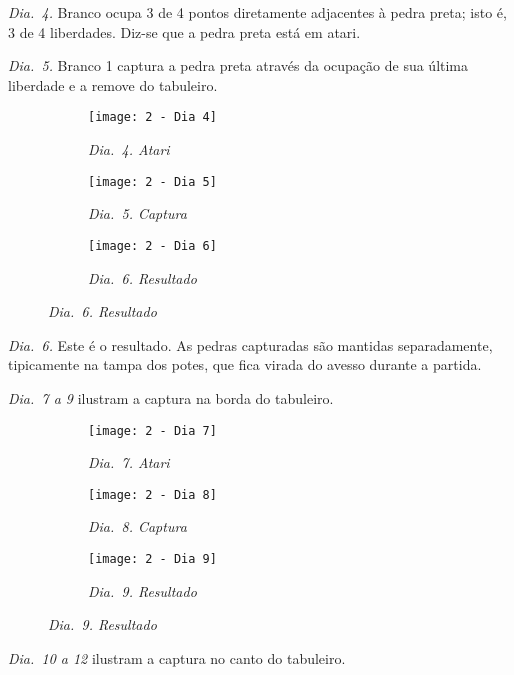 \emph{Dia.\@~4.} Branco ocupa 3 de 4 pontos diretamente adjacentes à pedra preta; isto é, 3 de 4 liberdades. Diz-se que a pedra preta está em atari.

\emph{Dia.\@~5.} Branco 1 captura a pedra preta através da ocupação de sua última liberdade e a remove do tabuleiro.

\begin{figure}[h]
    \centering
    \begin{subfigure}{.3\textwidth}
        \centering
        \texttt{[image: 2 - Dia 4]}
        \caption*{\emph{Dia.\@~4. Atari}}
    \end{subfigure}
    \begin{subfigure}{.3\textwidth}
        \centering
        \texttt{[image: 2 - Dia 5]}
        \caption*{\emph{Dia.\@~5. Captura}}
    \end{subfigure}
    \begin{subfigure}{.3\textwidth}
        \centering
        \texttt{[image: 2 - Dia 6]}
        \caption*{\emph{Dia.\@~6. Resultado}}
    \end{subfigure}
\end{figure}

\emph{Dia.\@~6.} Este é o resultado. As pedras capturadas são mantidas separadamente, tipicamente na tampa dos potes, que fica virada do avesso durante a partida.

\emph{Dia.\@~7 a 9} ilustram a captura na borda do tabuleiro.

\begin{figure}[h]
    \centering
    \begin{subfigure}{.3\textwidth}
        \centering
        \texttt{[image: 2 - Dia 7]}
        \caption*{\emph{Dia.\@~7. Atari}}
    \end{subfigure}
    \begin{subfigure}{.3\textwidth}
        \centering
        \texttt{[image: 2 - Dia 8]}
        \caption*{\emph{Dia.\@~8. Captura}}
    \end{subfigure}
    \begin{subfigure}{.3\textwidth}
        \centering
        \texttt{[image: 2 - Dia 9]}
        \caption*{\emph{Dia.\@~9. Resultado}}
    \end{subfigure}
\end{figure}

\pagebreak

\emph{Dia.\@~10 a 12} ilustram a captura  no canto do tabuleiro.

